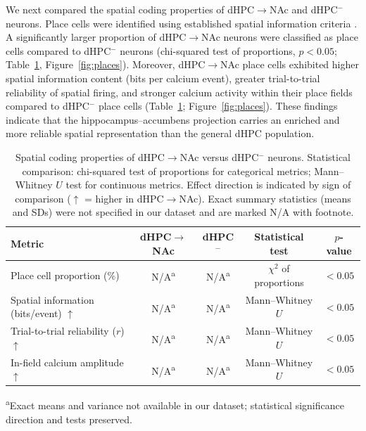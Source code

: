\documentclass[11pt]{article}
\begin{document}
We next compared the spatial coding properties of dHPC$\to$NAc and dHPC$^-$ neurons. Place cells were identified using established spatial information criteria \citep{skaggs1993information,markus1994spatial}. A significantly larger proportion of dHPC$\to$NAc neurons were classified as place cells compared to dHPC$^-$ neurons (chi-squared test of proportions, $p<0.05$; Table~\ref{tab:place_cells}, Figure~\ref{fig:places}). Moreover, dHPC$\to$NAc place cells exhibited higher spatial information content (bits per calcium event), greater trial-to-trial reliability of spatial firing, and stronger calcium activity within their place fields compared to dHPC$^-$ place cells (Table~\ref{tab:place_cells}; Figure~\ref{fig:places}). These findings indicate that the hippocampus--accumbens projection carries an enriched and more reliable spatial representation than the general dHPC population.

\begin{table}[H]
\centering
\caption{Spatial coding properties of dHPC$\to$NAc versus dHPC$^-$ neurons. Statistical comparison: chi-squared test of proportions for categorical metrics; Mann--Whitney $U$ test for continuous metrics. Effect direction is indicated by sign of comparison ($\uparrow$ = higher in dHPC$\to$NAc). Exact summary statistics (means and SDs) were not specified in our dataset and are marked N/A with footnote.}
\label{tab:place_cells}
\begin{tabular}{lcccc}
\toprule
Metric & dHPC$\to$NAc & dHPC$^-$ & Statistical test & $p$-value \\
\midrule
Place cell proportion (\%) & N/A\textsuperscript{a} & N/A\textsuperscript{a} & $\chi^2$ of proportions & $<0.05$ \\
Spatial information (bits/event) $\uparrow$ & N/A\textsuperscript{a} & N/A\textsuperscript{a} & Mann--Whitney $U$ & $<0.05$ \\
Trial-to-trial reliability ($r$) $\uparrow$ & N/A\textsuperscript{a} & N/A\textsuperscript{a} & Mann--Whitney $U$ & $<0.05$ \\
In-field calcium amplitude $\uparrow$ & N/A\textsuperscript{a} & N/A\textsuperscript{a} & Mann--Whitney $U$ & $<0.05$ \\
\bottomrule
\end{tabular}
\vspace{2pt}

\footnotesize{\textsuperscript{a}Exact means and variance not available in our dataset; statistical significance direction and tests preserved.}
\end{table}
\end{document}
